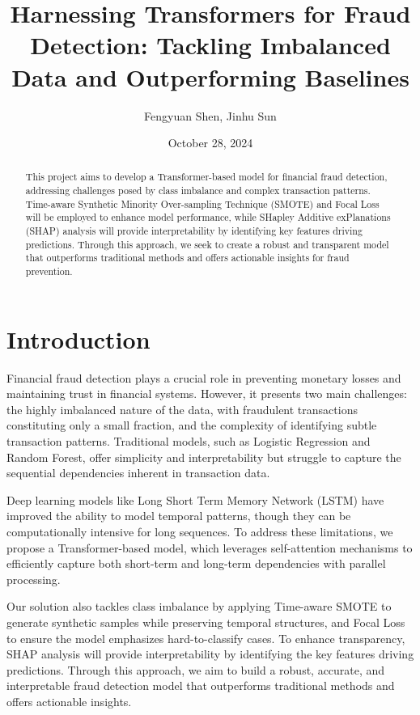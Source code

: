\documentclass[11pt, oneside]{article}   	%
\title{Harnessing Transformers for Fraud Detection: Tackling Imbalanced Data and Outperforming Baselines}
\author{Fengyuan Shen, Jinhu Sun}
\date{October 28, 2024}		%
\begin{document}
\maketitle
\begin{abstract}
This project aims to develop a Transformer-based model for financial fraud detection, addressing challenges posed by class imbalance and complex transaction patterns. Time-aware Synthetic Minority Over-sampling Technique (SMOTE) and Focal Loss will be employed to enhance model performance, while SHapley Additive exPlanations (SHAP) analysis will provide interpretability by identifying key features driving predictions. Through this approach, we seek to create a robust and transparent model that outperforms traditional methods and offers actionable insights for fraud prevention.
\end{abstract}


\section{Introduction}

Financial fraud detection plays a crucial role in preventing monetary losses and maintaining trust in financial systems. However, it presents two main challenges: the highly imbalanced nature of the data, with fraudulent transactions constituting only a small fraction, and the complexity of identifying subtle transaction patterns. Traditional models, such as Logistic Regression and Random Forest, offer simplicity and interpretability but struggle to capture the sequential dependencies inherent in transaction data. 

Deep learning models like Long Short Term Memory Network (LSTM) have improved the ability to model temporal patterns, though they can be computationally intensive for long sequences. To address these limitations, we propose a Transformer-based model, which leverages self-attention mechanisms to efficiently capture both short-term and long-term dependencies with parallel processing. 

Our solution also tackles class imbalance by applying Time-aware SMOTE to generate synthetic samples while preserving temporal structures, and Focal Loss to ensure the model emphasizes hard-to-classify cases. To enhance transparency, SHAP analysis will provide interpretability by identifying the key features driving predictions. Through this approach, we aim to build a robust, accurate, and interpretable fraud detection model that outperforms traditional methods and offers actionable insights.
\end{document}
